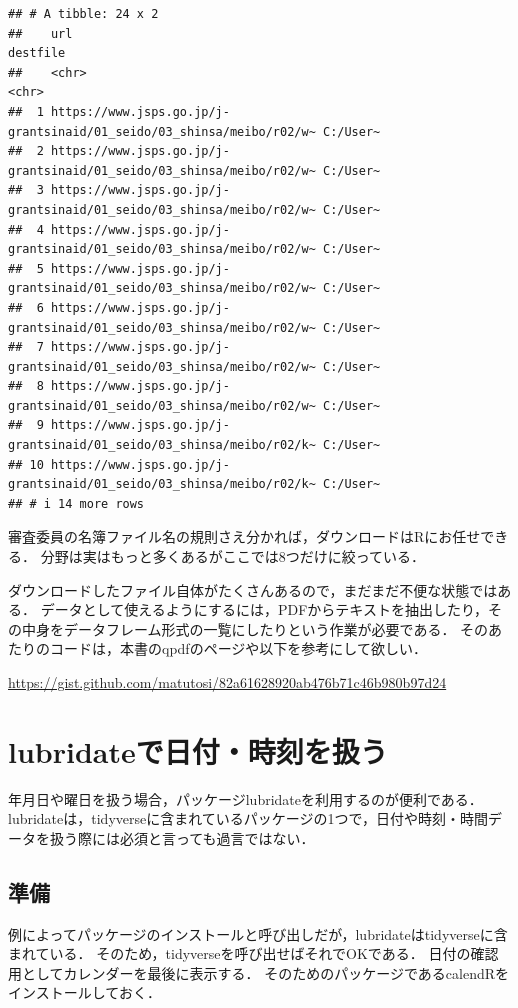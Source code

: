 \documentclass[
]{article}
\begin{document}
\begin{verbatim}
## # A tibble: 24 x 2
##    url                                                                  destfile
##    <chr>                                                                <chr>   
##  1 https://www.jsps.go.jp/j-grantsinaid/01_seido/03_shinsa/meibo/r02/w~ C:/User~
##  2 https://www.jsps.go.jp/j-grantsinaid/01_seido/03_shinsa/meibo/r02/w~ C:/User~
##  3 https://www.jsps.go.jp/j-grantsinaid/01_seido/03_shinsa/meibo/r02/w~ C:/User~
##  4 https://www.jsps.go.jp/j-grantsinaid/01_seido/03_shinsa/meibo/r02/w~ C:/User~
##  5 https://www.jsps.go.jp/j-grantsinaid/01_seido/03_shinsa/meibo/r02/w~ C:/User~
##  6 https://www.jsps.go.jp/j-grantsinaid/01_seido/03_shinsa/meibo/r02/w~ C:/User~
##  7 https://www.jsps.go.jp/j-grantsinaid/01_seido/03_shinsa/meibo/r02/w~ C:/User~
##  8 https://www.jsps.go.jp/j-grantsinaid/01_seido/03_shinsa/meibo/r02/w~ C:/User~
##  9 https://www.jsps.go.jp/j-grantsinaid/01_seido/03_shinsa/meibo/r02/k~ C:/User~
## 10 https://www.jsps.go.jp/j-grantsinaid/01_seido/03_shinsa/meibo/r02/k~ C:/User~
## # i 14 more rows
\end{verbatim}

審査委員の名簿ファイル名の規則さえ分かれば，ダウンロードはRにお任せできる．
分野は実はもっと多くあるがここでは8つだけに絞っている．

ダウンロードしたファイル自体がたくさんあるので，まだまだ不便な状態ではある．
データとして使えるようにするには，PDFからテキストを抽出したり，その中身をデータフレーム形式の一覧にしたりという作業が必要である．
そのあたりのコードは，本書のqpdfのページや以下を参考にして欲しい．

\url{https://gist.github.com/matutosi/82a61628920ab476b71c46b980b97d24}

\hypertarget{lubridate}{%
\section{lubridateで日付・時刻を扱う}\label{lubridate}}

年月日や曜日を扱う場合，パッケージlubridateを利用するのが便利である．
lubridateは，tidyverseに含まれているパッケージの1つで，日付や時刻・時間データを扱う際には必須と言っても過言ではない．

\hypertarget{ux6e96ux5099-2}{%
\subsection{準備}\label{ux6e96ux5099-2}}

例によってパッケージのインストールと呼び出しだが，lubridateはtidyverseに含まれている．
そのため，tidyverseを呼び出せばそれでOKである．
日付の確認用としてカレンダーを最後に表示する．
そのためのパッケージであるcalendRをインストールしておく．
\end{document}
